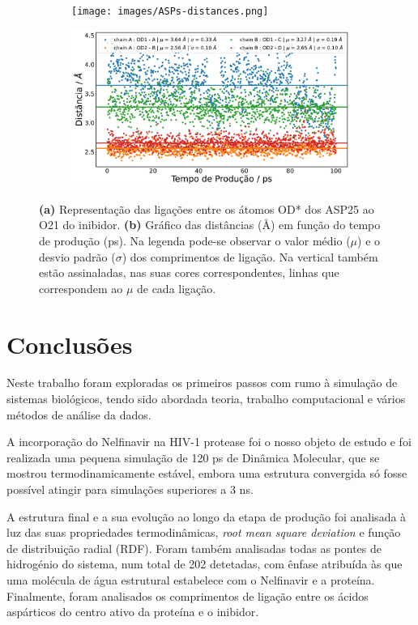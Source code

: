 \documentclass[12pt,a4paper]{article}
\begin{document}
	\begin{figure}[h]
		\begin{subfigure}[b]{0.34\textwidth}
			\centering
			\texttt{[image: images/ASPs-distances.png]}
			\caption{}
			\label{fig:an:dists-vmd}
		\end{subfigure}
		\begin{subfigure}[b]{0.64\textwidth}
			\centering
			\includegraphics[width=\textwidth]{images/plots-ASP-1UN.pdf}
			\caption{}
			\label{fig:an:dists-plot}
		\end{subfigure}
		\caption{\textbf{(a)} Representação das ligações entre os átomos OD* dos ASP25 ao O21 do inibidor. \textbf{(b)} Gráfico das distâncias (\AA) em função do tempo de produção (ps). Na legenda pode-se observar o valor médio ($\mu$) e o desvio padrão ($\sigma$) dos comprimentos de ligação. Na vertical também estão assinaladas, nas suas cores correspondentes, linhas que correspondem ao $\mu$ de cada ligação.}
		\label{fig:an:ASP-1UN}
	\end{figure}

\section{Conclusões}
	Neste trabalho foram exploradas os primeiros passos com rumo à simulação de sistemas biológicos, tendo sido abordada teoria, trabalho computacional e vários métodos de análise da dados.
	
	A incorporação do Nelfinavir na HIV-1 protease foi o nosso objeto de estudo e foi realizada uma pequena simulação de 120 ps de Dinâmica Molecular, que se mostrou termodinamicamente estável, embora uma estrutura convergida só fosse possível atingir para simulações superiores a 3 ns.
	
	A estrutura final e a sua evolução ao longo da etapa de produção foi analisada à luz das suas propriedades termodinâmicas, \textit{root mean square deviation} e função de distribuição radial (RDF).	Foram também analisadas todas as pontes de hidrogénio do sistema, num total de 202 detetadas, com ênfase atribuída às que uma molécula de água estrutural estabelece com o Nelfinavir e a proteína. Finalmente, foram analisados os comprimentos de ligação entre os ácidos aspárticos do centro ativo da proteína e o inibidor.
	
\end{document}
